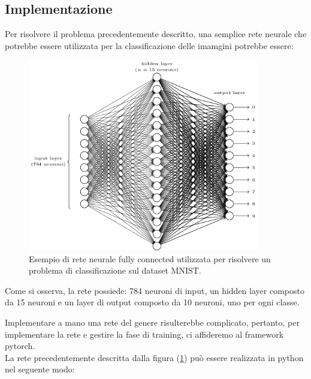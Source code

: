 \subsection{Implementazione}
Per risolvere il problema precedentemente descritto, una semplice 
rete neurale che potrebbe essere utilizzata per la classificazione 
delle imamgini potrebbe essere:

\begin{figure}[H]
    \centering
    \includegraphics[width=0.9\textwidth]{Immagini/Grafici/DNN_MNIST.png}
    \caption{ Esempio di rete neurale fully connected utilizzata per risolvere un problema di
    classificazione sul dataset MNIST.}
    \label{fig:DNN_MNIST}
\end{figure}

Come si osserva, la rete possiede: $784$ neuroni di input, un hidden layer 
composto da 15 neuroni e un layer di output composto da 10 neuroni, uno 
per ogni classe.

Implementare a mano una rete del genere risulterebbe complicato, pertanto,
per implementare la rete e gestire la fase di training, ci affideremo al 
framework pytorch.
\\
La rete precedentemente descritta dalla figura (\ref{fig:DNN_MNIST}) 
può essere realizzata in python nel seguente modo:

